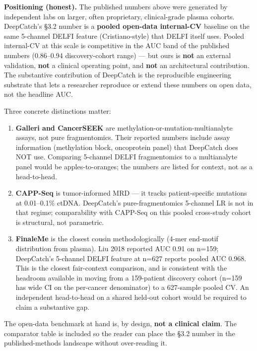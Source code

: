 \documentclass[11pt]{article}
\begin{document}
\textbf{Positioning (honest).} The published numbers above were generated by independent labs on larger, often proprietary, clinical-grade plasma cohorts. DeepCatch's \S{}3.2 number is a \textbf{pooled open-data internal-CV} baseline on the same 5-channel DELFI feature (Cristiano-style) that DELFI itself uses. Pooled internal-CV at this scale is competitive in the AUC band of the published numbers (0.86--0.94 discovery-cohort range) --- but ours is \textbf{not} an external validation, \textbf{not} a clinical operating point, and \textbf{not} an architectural contribution. The substantive contribution of DeepCatch is the reproducible engineering substrate that lets a researcher reproduce or extend these numbers on open data, not the headline AUC.

Three concrete distinctions matter:

\begin{enumerate}
\item
\textbf{Galleri and CancerSEEK} are methylation-or-mutation-multianalyte assays, not pure fragmentomics. Their reported numbers include assay information (methylation block, oncoprotein panel) that DeepCatch does NOT use. Comparing 5-channel DELFI fragmentomics to a multianalyte panel would be apples-to-oranges; the numbers are listed for context, not as a head-to-head.
\item
\textbf{CAPP-Seq} is tumor-informed MRD --- it tracks patient-specific mutations at 0.01--0.1\% ctDNA. DeepCatch's pure-fragmentomics 5-channel LR is not in that regime; comparability with CAPP-Seq on this pooled cross-study cohort is structural, not parametric.
\item
\textbf{FinaleMe} is the closest cousin methodologically (4-mer end-motif distribution from plasma). Liu 2018 reported AUC 0.91 on n=\allowbreak{}159; DeepCatch's 5-channel DELFI feature at n=\allowbreak{}627 reports pooled AUC 0.968. This is the closest fair-context comparison, and is consistent with the headroom available in moving from a 159-patient discovery cohort (n=\allowbreak{}159 has wide CI on the per-cancer denominator) to a 627-sample pooled CV. An independent head-to-head on a shared held-out cohort would be required to claim a substantive gap.
\end{enumerate}

The open-data benchmark at hand is, by design, \textbf{not a clinical claim}. The comparator table is included so the reader can place the \S{}3.2 number in the published-methods landscape without over-reading it.
\end{document}

